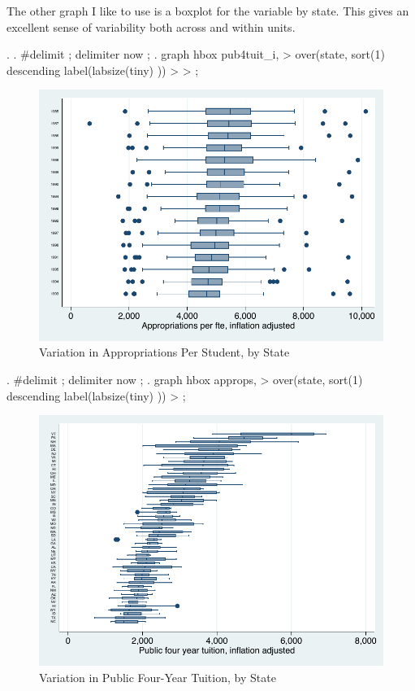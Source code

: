 \documentclass[12pt]{article}
\begin{document}
The other graph I like to use is a boxplot for the variable by
state. This gives an excellent sense of variability both across and
within units. 

\begin{stlog}
. 
. #delimit ;
delimiter now ;
. graph hbox pub4tuit_i,
> over(state, sort(1) descending label(labsize(tiny) )) 
> 
> ;  
\end{stlog}


\begin{figure}[h]
  \centering
  \includegraphics[width=\textwidth]{approps_box}
  \caption{Variation in Appropriations Per Student, by State}
\end{figure}


\begin{stlog}
  . #delimit ;
delimiter now ;
. graph hbox approps,
> over(state, sort(1) descending label(labsize(tiny) )) 
> ;
\end{stlog}


\begin{figure}[h]
  \centering
  \includegraphics[width=\textwidth]{tuit_box}
  \caption{Variation in Public Four-Year Tuition, by State}
\end{figure}
\end{document}
